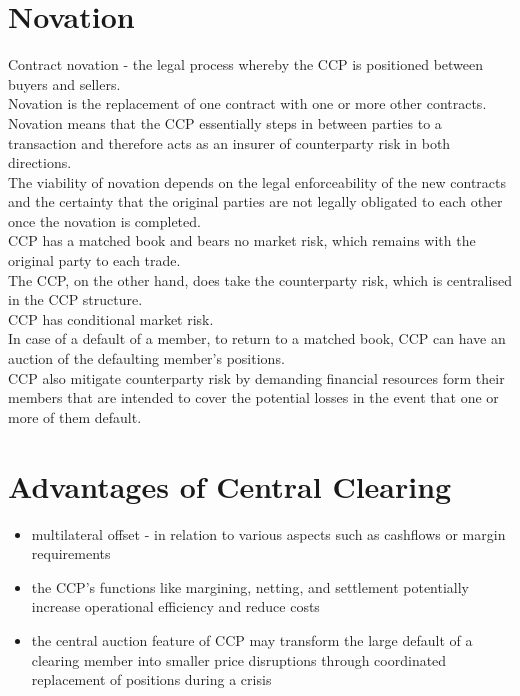 \section{Novation}
Contract novation - the legal process whereby the CCP is positioned between buyers and sellers.\\
Novation is the replacement of one contract with one or more other contracts.\\
Novation means that the CCP essentially steps in between parties to a transaction and therefore acts as an insurer of counterparty risk in both directions.\\
The viability of novation depends on the legal enforceability of the new contracts and the certainty that the original parties are not legally obligated to each other once the novation is completed.\\
CCP has a matched book and bears no market risk, which remains with the original party to each trade.\\
The CCP, on the other hand, does take the counterparty risk, which is centralised in the CCP structure.\\
CCP has conditional market risk.\\
In case of a default of a member, to return to a matched book, CCP can have an auction of the defaulting member's positions.\\
CCP also mitigate counterparty risk by demanding financial resources form their members that are intended to cover the potential losses in the event that one or more of them default.

\section{Advantages of Central Clearing}
\begin{itemize}
	\item multilateral offset - in relation to various aspects such as cashflows or margin requirements
	\item the CCP's functions like margining, netting, and settlement potentially increase operational efficiency and reduce costs
	\item the central auction feature of CCP may transform the large default of a clearing member into smaller price disruptions through coordinated replacement of positions during a crisis
\end{itemize}

